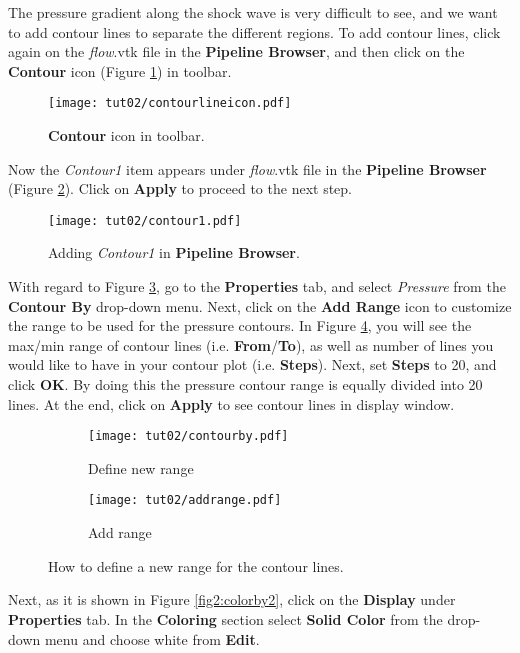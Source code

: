 The pressure gradient along the shock wave is very difficult to see, and we want to add contour lines to
separate the different regions. To add contour lines, click again on the \textit{flow}.vtk file in the \textbf{Pipeline Browser}, and then click on the \textbf{Contour} icon (Figure \ref{fig2:contour_icon}) in toolbar.
\begin{figure}[htbp]
    \centering
    \texttt{[image: tut02/contourlineicon.pdf]}
    \caption{\textbf{Contour} icon in toolbar.}
    \label{fig2:contour_icon}
\end{figure}
Now the \textit{Contour1} item appears under \textit{flow}.vtk file in the \textbf{Pipeline Browser} (Figure \ref{fig2:contour1}). Click on \textbf{Apply} to proceed to the next step.
\begin{figure}[htbp]
    \centering
    \texttt{[image: tut02/contour1.pdf]}
    \caption{Adding \textit{Contour1} in \textbf{Pipeline Browser}.}
    \label{fig2:contour1}
\end{figure}
With regard to Figure \ref{fig2:contourby a}, go to the \textbf{Properties} tab, and select \textit{Pressure} from the \textbf{Contour By} drop-down menu. Next, click on the \textbf{Add Range} icon to customize the range to be used for the pressure contours. In Figure \ref{fig2:contourby b}, you will see the max/min range of contour lines (i.e. \textbf{From}/\textbf{To}), as well as number of lines you would like to have in your contour plot (i.e. \textbf{Steps}). Next, set \textbf{Steps} to 20, and click \textbf{OK}. By doing this the pressure contour range is equally divided into 20 lines. At the end, click on \textbf{Apply} to see contour lines in display window.
\begin{figure}[htbp]
    \centering
     \begin{subfigure}[b]{.4\textwidth}
         \centering
         \texttt{[image: tut02/contourby.pdf]}
         \caption{Define new range}
         \label{fig2:contourby a}
     \end{subfigure}
     \hfill
     \begin{subfigure}[b]{.4\textwidth}
         \centering
         \texttt{[image: tut02/addrange.pdf]}
         \caption{Add range}
         \label{fig2:contourby b}
     \end{subfigure}     
    \caption{How to define a new range for the contour lines.}
    \label{fig2:contourby}
\end{figure}
Next, as it is shown in Figure \ref{fig2:colorby2}, click on the \textbf{Display} under \textbf{Properties} tab. In the \textbf{Coloring} section select \textbf{Solid Color} from the drop-down menu and choose white from \textbf{Edit}.
